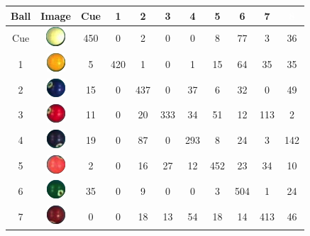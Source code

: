 \begin{table}[htpb]
\begin{center}
	\begin{tabular}{|c|c|c|c|c|c|c|c|c|c|c|}
		\hline
		Ball & Image & Cue & \cellcolor{yellow}1 & \cellcolor{blue}2 & \cellcolor{red}3  & \cellcolor{purple}4 & \cellcolor{orange}5 & \cellcolor{green}6 & \cellcolor{brown}7 & \cellcolor{black}\textcolor{white}{8} \\
		\hline
		Cue &\includegraphics[]{images/ballsInVotes/0} & \cellcolor{gray}450 & 0 & 2 & 0 & 0 & 8 & 77 & 3 & 36\\
		\hline
		1 &\includegraphics[]{images/ballsInVotes/1} & 5 & \cellcolor{gray}420 & 1 & 0 & 1 & 15 & 64 & 35 & 35\\
		\hline
		2 &\includegraphics[]{images/ballsInVotes/2} & 15 & 0 & \cellcolor{gray}437 & 0 & 37 & 6 & 32 & 0 & 49\\
		\hline
		3 &\includegraphics[]{images/ballsInVotes/3} & 11 & 0 & 20 & \cellcolor{gray}333 & 34 & 51 & 12 & 113 & 2\\
		\hline
		4 &\includegraphics[]{images/ballsInVotes/4} & 19 & 0 & 87 & 0 & \cellcolor{gray}293 & 8 & 24 & 3 & 142\\
		\hline
		5 &\includegraphics[]{images/ballsInVotes/5} & 2 & 0 & 16 & 27 & 12 & \cellcolor{gray}452 & 23 & 34 & 10\\
		\hline
		6 &\includegraphics[]{images/ballsInVotes/6} & 35 & 0 & 9 & 0 & 0 & 3 & \cellcolor{gray}504 & 1 & 24\\
		\hline
		7 &\includegraphics[]{images/ballsInVotes/7} & 0 & 0 & 18 & 13 & 54 & 18 & 14 & \cellcolor{gray}413 & 46\\

\end{tabular}
\end{center}
\end{table}
